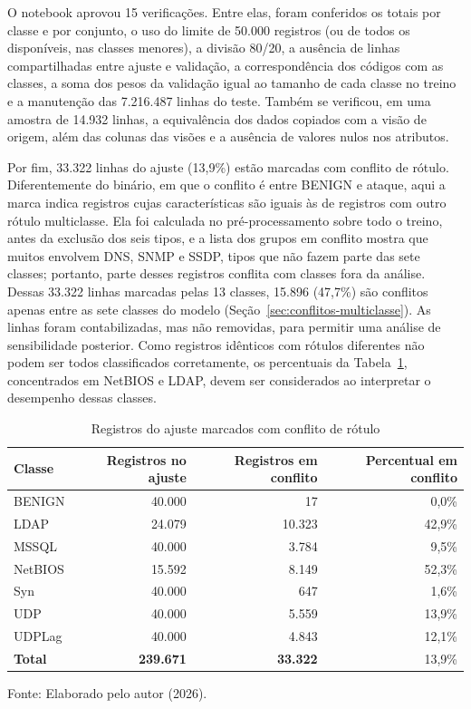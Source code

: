 \documentclass[
    12pt,                %
    openright,           %
    oneside,             %
    a4paper,             %
    english,             %
    brazil               %
]{abntex2}
\begin{document}
O notebook aprovou 15 verificações. Entre elas, foram conferidos os totais por classe e por conjunto, o uso do limite de 50.000 registros (ou de todos os disponíveis, nas classes menores), a divisão 80/20, a ausência de linhas compartilhadas entre ajuste e validação, a correspondência dos códigos com as classes, a soma dos pesos da validação igual ao tamanho de cada classe no treino e a manutenção das 7.216.487 linhas do teste. Também se verificou, em uma amostra de 14.932 linhas, a equivalência dos dados copiados com a visão de origem, além das colunas das visões e a ausência de valores nulos nos atributos.
 
Por fim, 33.322 linhas do ajuste (13,9\%) estão marcadas com conflito de rótulo. Diferentemente do binário, em que o conflito é entre BENIGN e ataque, aqui a marca indica registros cujas características são iguais às de registros com outro rótulo multiclasse. Ela foi calculada no pré-processamento sobre todo o treino, antes da exclusão dos seis tipos, e a lista dos grupos em conflito mostra que muitos envolvem DNS, SNMP e SSDP, tipos que não fazem parte das sete classes; portanto, parte desses registros conflita com classes fora da análise. Dessas 33.322 linhas marcadas pelas 13 classes, 15.896 (47,7\%) são conflitos apenas entre as sete classes do modelo (Seção~\ref{sec:conflitos-multiclasse}). As linhas foram contabilizadas, mas não removidas, para permitir uma análise de sensibilidade posterior. Como registros idênticos com rótulos diferentes não podem ser todos classificados corretamente, os percentuais da Tabela~\ref{tab:conflitos-ajuste-multiclasse}, concentrados em NetBIOS e LDAP, devem ser considerados ao interpretar o desempenho dessas classes.
 
\begin{table}
\centering
\caption{Registros do ajuste marcados com conflito de rótulo}
\label{tab:conflitos-ajuste-multiclasse}
\begin{tabular}{lrrr}
\hline
Classe & Registros no ajuste & Registros em conflito & Percentual em conflito \\
\hline
BENIGN & 40.000 & 17 & 0,0\% \\
LDAP & 24.079 & 10.323 & 42,9\% \\
MSSQL & 40.000 & 3.784 & 9,5\% \\
NetBIOS & 15.592 & 8.149 & 52,3\% \\
Syn & 40.000 & 647 & 1,6\% \\
UDP & 40.000 & 5.559 & 13,9\% \\
UDPLag & 40.000 & 4.843 & 12,1\% \\
\textbf{Total} & \textbf{239.671} & \textbf{33.322} & 13,9\% \\
\hline
\end{tabular}
\par\smallskip
Fonte: Elaborado pelo autor (2026).
\end{table}
\end{document}
